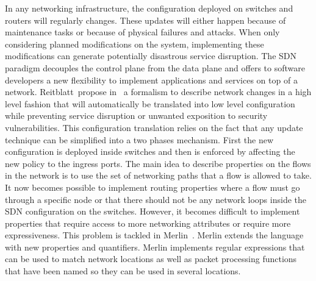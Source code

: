 In any networking infrastructure, the configuration deployed on switches and routers will regularly changes. These updates will either happen because of maintenance tasks or because of physical failures and attacks.
When only considering planned modifications on the system, implementing these modifications can generate potentially disastrous service disruption.
The SDN paradigm decouples the control plane from the data plane and offers to software developers a new flexibility to implement applications and services on top of a network.
Reitblatt~\etal propose in~\cite{abstraction-reitblatt2012} a formalism to describe network changes in a high level fashion that will automatically be translated into low level configuration while preventing service disruption or unwanted exposition to security vulnerabilities.
This configuration translation relies on the fact that any update technique can be simplified into a two phases mechanism. First the new configuration is deployed inside switches and then is enforced by affecting the new policy to the ingress ports.
The main idea to describe properties on the flows in the network is to use the set of networking paths that a flow is allowed to take.
It now becomes possible to implement routing properties where a flow must go through a specific node or that there should not be any network loops inside the SDN configuration on the switches.
However, it becomes difficult to implement properties that require access to more networking attributes or require more expressiveness. This problem is tackled in Merlin~\cite{Merlin-Soule2013}.
Merlin extends the language with new properties and quantifiers.
Merlin implements regular expressions that can be used to match network locations as well as packet processing functions that have been named so they can be used in several locations.


